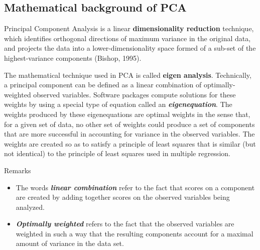 \subsection{Mathematical background of PCA}
Principal Component Analysis is a linear \textbf{dimensionality reduction} technique, which identifies orthogonal directions of maximum variance in the original data, and projects the data into a lower-dimensionality space formed of a sub-set of the highest-variance components (Bishop, 1995).


The mathematical technique used in PCA is called \textbf{eigen analysis}. Technically, a principal component can be
defined as a linear combination of optimally-weighted observed variables. Software packages compute solutions for these weights by using a special
type of equation called an \textbf{\emph{eigenequation}}. The weights produced by these eigenequations are
optimal weights in the sense that, for a given set of data, no other set of weights could produce a
set of components that are more successful in accounting for variance in the observed variables.
The weights are created so as to satisfy a principle of least squares that is similar (but not identical) to
the principle of least squares used in multiple regression.

Remarks
\begin{itemize}
	\item The words \textbf{\emph{linear combination}} refer to the fact that scores on a
	component are created by adding together scores on the observed variables being analyzed.
	\item \textbf{\emph{Optimally weighted}} refers to the fact that the observed variables are weighted in such a way
	that the resulting components account for a maximal amount of variance in the data set.
\end{itemize}



